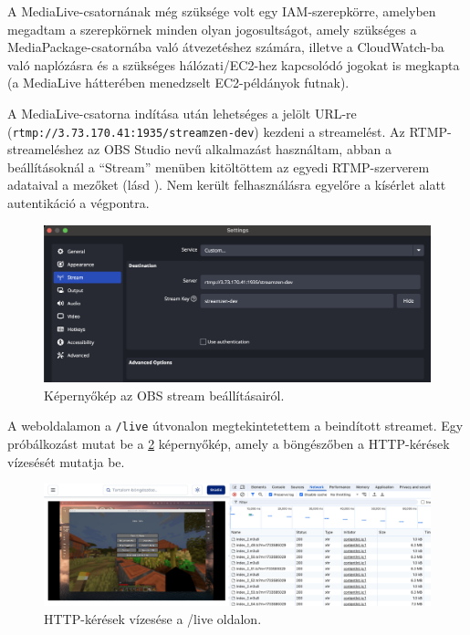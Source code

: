 A MediaLive-csatornának még szüksége volt egy IAM-szerepkörre, amelyben megadtam a szerepkörnek minden olyan jogosultságot, amely szükséges a MediaPackage-csatornába való átvezetéshez számára, illetve a CloudWatch-ba való naplózásra és a szükséges hálózati/EC2-hez kapcsolódó jogokat is megkapta (a MediaLive hátterében menedzselt EC2-példányok futnak).

A MediaLive-csatorna indítása után lehetséges a jelölt URL-re (\verb|rtmp://3.73.170.41:1935/streamzen-dev|) kezdeni a streamelést. Az RTMP-streameléshez az OBS Studio nevű alkalmazást használtam\cite{obsMediaLive}, abban a beállításoknál a ``Stream'' menüben kitöltöttem az egyedi RTMP-szerverem adataival a mezőket (lásd ). Nem került felhasználásra egyelőre a kísérlet alatt autentikáció a végpontra.

\begin{figure}[ht]
  \centering
  \includegraphics[width=150mm, keepaspectratio]{figures/obs.png}
  \caption{Képernyőkép az OBS stream beállításairól.}
  \label{fig:obs}
\end{figure}

A weboldalamon a \verb|/live| útvonalon megtekintetettem a beindított streamet. Egy próbálkozást mutat be a \ref{fig:waterfall} képernyőkép, amely a böngészőben a HTTP-kérések vízesését\cite{waterfall} mutatja be.

\begin{figure}[h]
  \centering
  \includegraphics[width=150mm, keepaspectratio]{figures/waterfall.png}
  \caption{HTTP-kérések vízesése a /live oldalon.}
  \label{fig:waterfall}
\end{figure}

